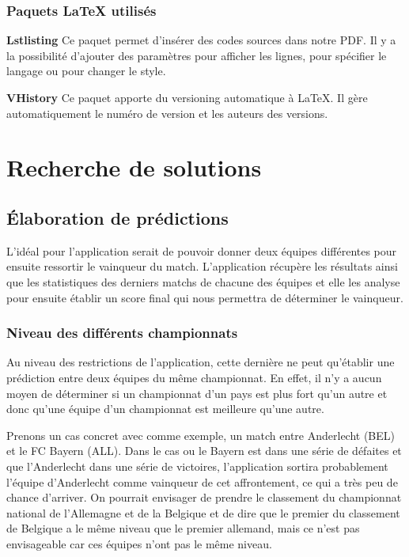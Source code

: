\documentclass[a4paper,14pt]{extarticle}
\begin{document}
{\subsubsection{Paquets \LaTeX{} utilisés}

\noindent\textbf{Lstlisting}
Ce paquet permet d'insérer des codes sources dans notre PDF. Il y a la possibilité d'ajouter des paramètres pour afficher les lignes, pour spécifier le langage ou pour changer le style.

\noindent\textbf{VHistory}
Ce paquet apporte du versioning automatique à \LaTeX. Il gère automatiquement le numéro de version et les auteurs des versions.

\section{Recherche de solutions}

\subsection{Élaboration de prédictions}

L'idéal pour l'application serait de pouvoir donner deux équipes différentes pour ensuite ressortir le vainqueur du match. L'application récupère les résultats ainsi que les statistiques des derniers matchs de chacune des équipes et elle les analyse pour ensuite établir un score final qui nous permettra de déterminer le vainqueur.


\subsubsection{Niveau des différents championnats}
\label{niveauDifferentChampionnats}
Au niveau des restrictions de l'application, cette dernière ne peut qu'établir une prédiction entre deux équipes du même championnat. En effet, il n'y a aucun moyen de déterminer si un championnat d'un pays est plus fort qu'un autre et donc qu'une équipe d'un championnat est meilleure qu'une autre. 

Prenons un cas concret avec comme exemple, un match entre Anderlecht (BEL) et le FC Bayern (ALL). Dans le cas ou le Bayern est dans une série de défaites et que l'Anderlecht dans une série de victoires, l'application sortira probablement l'équipe d'Anderlecht comme vainqueur de cet affrontement, ce qui a très peu de chance d'arriver. 
On pourrait envisager de prendre le classement du championnat national de l'Allemagne et de la Belgique et de dire que le premier du classement de Belgique a le même niveau que le premier allemand, mais ce n'est pas envisageable car ces équipes n'ont pas le même niveau.  

}
\end{document}
